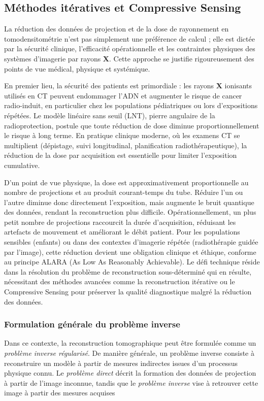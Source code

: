 \subsection{Méthodes itératives et Compressive Sensing}

La réduction des données de projection et de la dose de rayonnement en tomodensitométrie n'est
pas simplement une préférence de calcul ; elle est dictée par la sécurité clinique, l'efficacité
opérationnelle et les contraintes physiques des systèmes d'imagerie par rayons \(\mathbf{X}\). 
Cette approche se justifie rigoureusement des points de vue médical, physique et systémique.

En premier lieu, la sécurité des patients est primordiale : les rayons \(\mathbf{X}\) ionisants
utilisés en CT peuvent endommager l'ADN et augmenter le risque de cancer radio-induit,
en particulier chez les populations pédiatriques ou lors d'expositions répétées. Le modèle
linéaire sans seuil (LNT), pierre angulaire de la radioprotection, postule que toute
réduction de dose diminue proportionnellement le risque à long terme. En pratique clinique
moderne, où les examens CT se multiplient (dépistage, suivi longitudinal, planification
radiothérapeutique), la réduction de la dose par acquisition est essentielle pour limiter
l'exposition cumulative.

D'un point de vue physique, la dose est approximativement proportionnelle au nombre de
projections et au produit courant-temps du tube. Réduire l'un ou l'autre diminue donc
directement l'exposition, mais augmente le bruit quantique des données, rendant la
reconstruction plus difficile. Opérationnellement, un plus petit nombre de projections
raccourcit la durée d'acquisition, réduisant les artefacts de mouvement et améliorant le
débit patient. Pour les populations sensibles (enfants) ou dans des contextes d'imagerie
répétée (radiothérapie guidée par l'image), cette réduction devient une obligation clinique
et éthique, conforme au principe ALARA (As Low As Reasonably Achievable). Le défi technique
réside dans la résolution du problème de reconstruction sous-déterminé qui en résulte,
nécessitant des méthodes avancées comme la reconstruction itérative ou le Compressive Sensing \cite{12}
pour préserver la qualité diagnostique malgré la réduction des données.

\subsubsection{Formulation générale du problème inverse}
Dans ce contexte, la reconstruction tomographique peut être formulée comme un
\textit{problème inverse régularisé}. De manière générale, un problème inverse \cite{10} consiste
à reconstruire un modèle à partir de mesures indirectes issues d'un processus physique
connu. Le \textit{problème direct} décrit la formation des données de projection à partir
de l'image inconnue, tandis que le \textit{problème inverse} vise à retrouver cette image à
partir des mesures acquises


